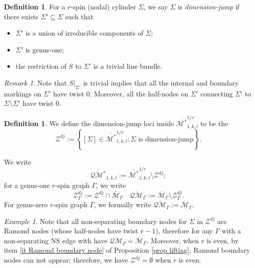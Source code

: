 \documentclass[11pt,a4paper]{article}
\theoremstyle{definition}
\newtheorem{dfn}[dummy]{Definition}
\theoremstyle{remark}
\newtheorem{rmk}[dummy]{Remark}
\newtheorem{ex}[dummy]{Example}
\newcommand{\oQMb}{{\overline{\mathcal{QM}}}}
\numberwithin{equation}{section}
\def\Mbar{{\overline{\mathcal M}}}
\def\Mbarstar{{\overline{\mathcal M^*}}}
\begin{document}
\begin{dfn}
    For a $r$-spin (nodal) cylinder $\Sigma$, we say $\Sigma$ is \textit{dimension-jump} if there exists $\Sigma'\subseteq \Sigma$ such that
    \begin{itemize}
        \item $\Sigma'$ is a union of irreducible components of $\Sigma$;
        \item $\Sigma'$ is genus-one;
        \item the restriction of $S$ to $\Sigma'$ is a trivial line bundle.
    \end{itemize}
\end{dfn}
\begin{rmk}
    Note that $S\vert_{\Sigma'}$ is trivial implies that all the internal and boundary markings on $\Sigma'$ have twist $0$. Moreover, all the half-nodes on $\Sigma'$ connecting $\Sigma'$ to $\Sigma\setminus\Sigma'$ have twist $0$.
\end{rmk}

\begin{dfn}
    We define the dimension-jump loci inside $\Mbarstar^{1/r}_{1,k,l}$ to be the 
    \begin{equation*}
         \mathcal Z^{dj}:=\left\{[\Sigma]\in \Mbarstar^{1/r}_{1,k,l} \colon \Sigma \text{ is dimension-jump}\right\}.
    \end{equation*}

    We write 
    \begin{equation*}
        \overline{\mathcal{QM}^*}_{1,k,l}:=\Mbarstar^{1/r}_{1,k,l}\setminus \mathcal Z^{dj};
    \end{equation*}
    for a genus-one $r$-spin graph $\Gamma$, we write 
    \begin{equation*}
        \mathcal Z^{dj}_{\Gamma}:=\mathcal Z^{dj}\cap \Mbar_{\Gamma}\quad\oQMb_\Gamma:=\Mbar_\Gamma\setminus \mathcal Z^{dj}_{\Gamma}.
    \end{equation*}
    For genus-zero $r$-spin graph $\Gamma$, we formally write $\oQMb_\Gamma:=\Mbar_\Gamma$.
\end{dfn}

\begin{ex}\label{exa dim jump non separating}
    Note that all non-separating boundary nodes for $\Sigma$ in $\mathcal Z^{dj}$ are Ramond nodes (whose half-nodes have twist $r-1$), therefore for any $\Gamma$ with a non-separating NS edge with have $\oQMb_{\Gamma}=\Mbar_{\Gamma}$.     
   Moreover, when $r$ is even, by item \ref{it Ramond boundary node} of Proposition \ref{prop lifting}, Ramond boundary nodes can not appear; therefore, we have $\mathcal Z^{dj}=\emptyset$ when $r$ is even.
\end{ex}
\end{document}
